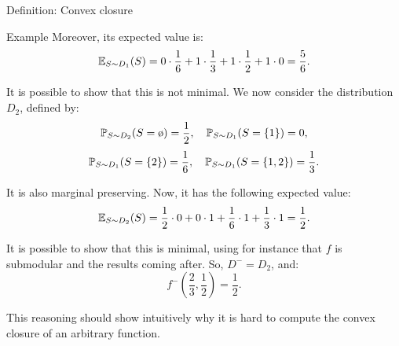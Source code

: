 \documentclass[a4paper]{article}
\begin{document}
\begin{parag}{Definition: Convex closure}
\begin{subparag}{Example}
        Moreover, its expected value is: 
        \[\exval_{S \followsdistr D_1}\left(S\right) = 0\cdot \frac{1}{6} + 1\cdot \frac{1}{3} + 1\cdot \frac{1}{2} + 1\cdot 0 = \frac{5}{6}.\]

        It is possible to show that this is not minimal. We now consider the distribution $D_2$, defined by:
        \[\prob_{S \followsdistr D_2}\left(S = \o\right) = \frac{1}{2}, \mathspace \prob_{S \followsdistr D_1}\left(S = \left\{1\right\}\right) = 0,\]
        \[\prob_{S \followsdistr D_1}\left(S = \left\{2\right\}\right) = \frac{1}{6}, \mathspace \prob_{S \followsdistr D_1}\left(S = \left\{1, 2\right\}\right) = \frac{1}{3}.\]

        It is also marginal preserving. Now, it has the following expected value: 
        \[\exval_{S \followsdistr D_2}\left(S\right) = \frac{1}{2}\cdot 0 + 0\cdot 1 + \frac{1}{6}\cdot 1 + \frac{1}{3}\cdot 1 = \frac{1}{2}.\]

        It is possible to show that this is minimal, using for instance that $f$ is submodular and the results coming after. So, $D^- = D_2$, and: 
        \[f^-\left(\frac{2}{3}, \frac{1}{2}\right) = \frac{1}{2}.\]

        This reasoning should show intuitively why it is hard to compute the convex closure of an arbitrary function.
    \end{subparag}
\end{parag}
\end{document}
